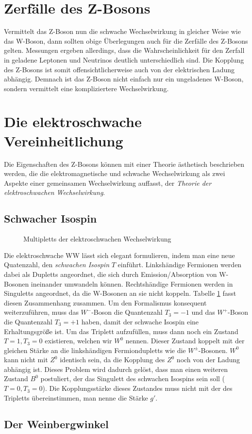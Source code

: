\section{Zerfälle des Z-Bosons}
Vermittelt das Z-Boson nun die schwache Wechselwirkung in gleicher Weise wie das W-Boson,
dann sollten obige Überlegungen auch für die Zerfälle des Z-Bosons gelten.
Messungen ergeben allerdings, dass die Wahrscheinlichkeit für den Zerfall in geladene Leptonen und Neutrinos deutlich unterschiedlich sind.
Die Kopplung des Z-Bosons ist somit offensichtlicherweise auch von der elektrischen Ladung abhängig.
Demnach ist das Z-Boson nicht einfach nur ein ungeladenes W-Boson, sondern vermittelt eine kompliziertere Wechselwirkung.

\section{Die elektroschwache Vereinheitlichung}
Die Eigenschaften des Z-Bosons können mit einer Theorie ästhetisch beschrieben werden,
die die elektromagnetische und schwache Wechselwirkung als zwei Aspekte einer gemeinsamen Wechselwirkung auffasst, der \textit{Theorie der elektroschwachen Wechselwirkung}.

\subsection{Schwacher Isospin}
\begin{figure}
	\centering
	\caption{Multipletts der elektroschwachen Wechselwirkung}
	\label{fig:weakisospin}
\end{figure}
Die elektroschwache WW lässt sich elegant formulieren, indem man eine neue Quatenzahl, den \textit{schwachen Isospin} $T$ einführt.
Linkshändige Fermionen werden dabei als Dupletts angeordnet, die sich durch Emission/Absorption von W-Bosonen ineinander umwandeln können.
Rechtshändige Fermionen werden in Singuletts angeordnet, da die W-Bosonen an sie nicht koppeln.
Tabelle \ref{fig:weakisospin} fasst diesen Zusammenhang zusammen.
Um den Formalismus konsequent weiterzuführen, muss das $W^-$-Boson die Quantenzahl $T_3=-1$ und das $W^+$-Boson die Quantenzahl $T_3=+1$ haben, damit der schwache Isospin eine Erhaltungsgröße ist.
Um das Triplett aufzufüllen, muss dann noch ein Zustand $T=1, T_3=0$ existieren, welchen wir $W^0$ nennen.
Dieser Zustand koppelt mit der gleichen Stärke an die linkshändigen Fermiondupletts wie die $W^\pm$-Bosonen.
$W^0$ kann nicht mit $Z^0$ identisch sein, da die Kopplung des $Z^0$ noch von der Ladung abhängig ist.
Dieses Problem wird dadurch gelöst, dass man einen weiteren Zustand $B^0$ postuliert, der das Singulett des schwachen Isospins sein soll ($T=0, T_3=0$).
Die Kopplungsstärke dieses Zustandes muss nicht mit der des Tripletts übereinstimmen, man nenne die Stärke $g'$.

\subsection{Der Weinbergwinkel}
